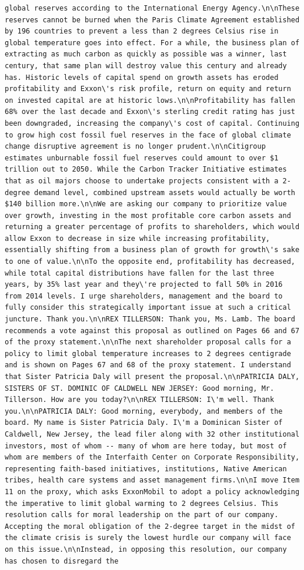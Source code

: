 \documentclass[
  letterpaper,
  DIV=11,
  numbers=noendperiod]{scrreprt}
\begin{document}
\begin{verbatim}
global reserves according to the International Energy Agency.\n\nThese reserves cannot be burned when the Paris Climate Agreement established by 196 countries to prevent a less than 2 degrees Celsius rise in global temperature goes into effect. For a while, the business plan of extracting as much carbon as quickly as possible was a winner, last century, that same plan will destroy value this century and already has. Historic levels of capital spend on growth assets has eroded profitability and Exxon\'s risk profile, return on equity and return on invested capital are at historic lows.\n\nProfitability has fallen 68% over the last decade and Exxon\'s sterling credit rating has just been downgraded, increasing the company\'s cost of capital. Continuing to grow high cost fossil fuel reserves in the face of global climate change disruptive agreement is no longer prudent.\n\nCitigroup estimates unburnable fossil fuel reserves could amount to over $1 trillion out to 2050. While the Carbon Tracker Initiative estimates that as oil majors choose to undertake projects consistent with a 2-degree demand level, combined upstream assets would actually be worth $140 billion more.\n\nWe are asking our company to prioritize value over growth, investing in the most profitable core carbon assets and returning a greater percentage of profits to shareholders, which would allow Exxon to decrease in size while increasing profitability, essentially shifting from a business plan of growth for growth\'s sake to one of value.\n\nTo the opposite end, profitability has decreased, while total capital distributions have fallen for the last three years, by 35% last year and they\'re projected to fall 50% in 2016 from 2014 levels. I urge shareholders, management and the board to fully consider this strategically important issue at such a critical juncture. Thank you.\n\nREX TILLERSON: Thank you, Ms. Lamb. The board recommends a vote against this proposal as outlined on Pages 66 and 67 of the proxy statement.\n\nThe next shareholder proposal calls for a policy to limit global temperature increases to 2 degrees centigrade and is shown on Pages 67 and 68 of the proxy statement. I understand that Sister Patricia Daly will present the proposal.\n\nPATRICIA DALY, SISTERS OF ST. DOMINIC OF CALDWELL NEW JERSEY: Good morning, Mr. Tillerson. How are you today?\n\nREX TILLERSON: I\'m well. Thank you.\n\nPATRICIA DALY: Good morning, everybody, and members of the board. My name is Sister Patricia Daly. I\'m a Dominican Sister of Caldwell, New Jersey, the lead filer along with 32 other institutional investors, most of whom -- many of whom are here today, but most of whom are members of the Interfaith Center on Corporate Responsibility, representing faith-based initiatives, institutions, Native American tribes, health care systems and asset management firms.\n\nI move Item 11 on the proxy, which asks ExxonMobil to adopt a policy acknowledging the imperative to limit global warming to 2 degrees Celsius. This resolution calls for moral leadership on the part of our company. Accepting the moral obligation of the 2-degree target in the midst of the climate crisis is surely the lowest hurdle our company will face on this issue.\n\nInstead, in opposing this resolution, our company has chosen to disregard the 
\end{verbatim}
\end{document}
